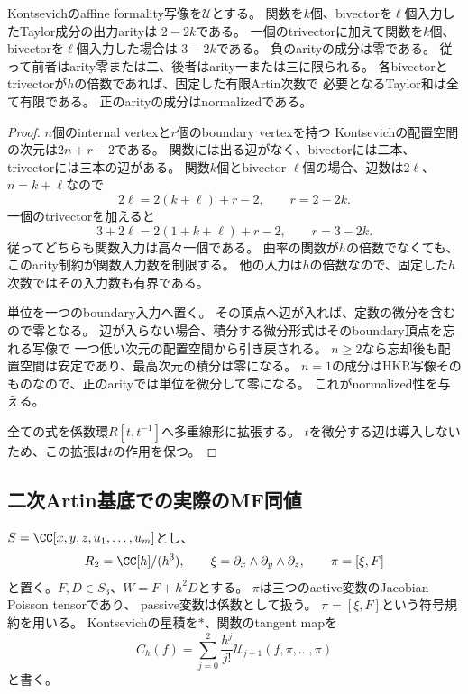 \begin{lemma}
\label{cg:lem:arity}
Kontsevichのaffine formality写像を$\mathcal U$とする。
関数を$k$個、bivectorを$\ell$個入力したTaylor成分の出力arityは
$2-2k$である。
一個のtrivectorに加えて関数を$k$個、bivectorを$\ell$個入力した場合は
$3-2k$である。
負のarityの成分は零である。
従って前者はarity零または二、後者はarity一または三に限られる。
各bivectorとtrivectorが$h$の倍数であれば、固定した有限Artin次数で
必要となるTaylor和は全て有限である。
正のarityの成分はnormalizedである。
\end{lemma}
\begin{proof}
$n$個のinternal vertexと$r$個のboundary vertexを持つ
Kontsevichの配置空間の次元は$2n+r-2$である。
関数には出る辺がなく、bivectorには二本、trivectorには三本の辺がある。
関数$k$個とbivector $\ell$個の場合、辺数は$2\ell$、$n=k+\ell$なので
\[
 2\ell=2(k+\ell)+r-2,\qquad r=2-2k.
\]
一個のtrivectorを加えると
\[
 3+2\ell=2(1+k+\ell)+r-2,\qquad r=3-2k.
\]
従ってどちらも関数入力は高々一個である。
曲率の関数が$h$の倍数でなくても、このarity制約が関数入力数を制限する。
他の入力は$h$の倍数なので、固定した$h$次数ではその入力数も有界である。

単位を一つのboundary入力へ置く。
その頂点へ辺が入れば、定数の微分を含むので零となる。
辺が入らない場合、積分する微分形式はそのboundary頂点を忘れる写像で
一つ低い次元の配置空間から引き戻される。
$n\ge2$なら忘却後も配置空間は安定であり、最高次元の積分は零になる。
$n=1$の成分はHKR写像そのものなので、正のarityでは単位を微分して零になる。
これがnormalized性を与える。

全ての式を係数環$R[t,t^{-1}]$へ多重線形に拡張する。
$t$を微分する辺は導入しないため、この拡張は$t$の作用を保つ。
\end{proof}

\subsection{二次Artin基底での実際のMF同値}

$S=\CC[x,y,z,u_1,\ldots,u_m]$とし、
\[
 R_2=\CC[h]/(h^3),\qquad
 \xi=\partial_x\wedge\partial_y\wedge\partial_z,\qquad
 \pi=[\xi,F]
\]
と置く。$F,D\in S_3$、$W=F+h^2D$とする。
$\pi$は三つのactive変数のJacobian Poisson tensorであり、
passive変数は係数として扱う。
$\pi=[\xi,F]$という符号規約を用いる。
Kontsevichの星積を$*$、関数のtangent mapを
\[
 C_h(f)=\sum_{j=0}^{2}\frac{h^j}{j!}
       \mathcal U_{j+1}(f,\pi,\ldots,\pi)
\]
と書く。

